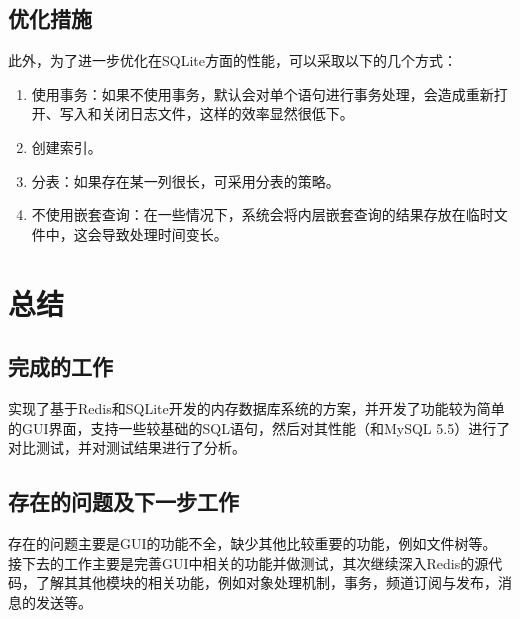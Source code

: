 \documentclass{zjutthesis}
\begin{document}
\section{优化措施}
此外，为了进一步优化在SQLite方面的性能，可以采取以下的几个方式：
\begin{enumerate}[label=\arabic*.]
\item{使用事务：如果不使用事务，默认会对单个语句进行事务处理，会造成重新打开、写入和关闭日志文件，这样的效率显然很低下。}
\item{创建索引。}
\item{分表：如果存在某一列很长，可采用分表的策略。}
\item{不使用嵌套查询：在一些情况下，系统会将内层嵌套查询的结果存放在临时文件中，这会导致处理时间变长。}
\end{enumerate}

\chapter{总结}
\section{完成的工作}
实现了基于Redis和SQLite开发的内存数据库系统的方案，并开发了功能较为简单的GUI界面，支持一些较基础的SQL语句，然后对其性能（和MySQL 5.5）进行了对比测试，并对测试结果进行了分析。

\section{存在的问题及下一步工作}
存在的问题主要是GUI的功能不全，缺少其他比较重要的功能，例如文件树等。
接下去的工作主要是完善GUI中相关的功能并做测试，其次继续深入Redis的源代码，了解其其他模块的相关功能，例如对象处理机制，事务，频道订阅与发布，消息的发送等。

\backmatter


\nocite{*}                                   %


\appendix

\end{document}

